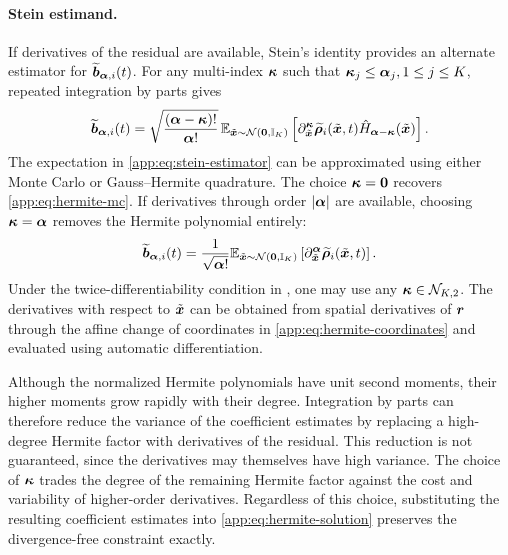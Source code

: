 \paragraph{Stein estimand.}
If derivatives of the residual are available, Stein's identity provides an alternate estimator for $\widetilde{\boldsymbol{b}}_{\boldsymbol{\alpha},i}(t)$.
For any multi-index $\boldsymbol{\kappa}$ such that $\boldsymbol{\kappa}_j \leq \boldsymbol{\alpha}_j, 1 \leq j \leq K$, repeated integration by parts gives
\begin{equation}\label{app:eq:stein-estimator}
\widetilde{\boldsymbol{b}}_{\boldsymbol{\alpha},i}(t)=\sqrt{\frac{(\boldsymbol{\alpha}-\boldsymbol{\kappa})!}{\boldsymbol{\alpha}!}}\,\mathbb{E}_{\tilde{\boldsymbol{x}}\sim\mathcal{N}(\boldsymbol{0},\mathbb{I}_K)}\left[\partial_{\tilde{\boldsymbol{x}}}^{\boldsymbol{\kappa}}\widetilde{\boldsymbol{\rho}}_i(\tilde{\boldsymbol{x}},t)\hat{H}_{\boldsymbol{\alpha}-\boldsymbol{\kappa}}(\tilde{\boldsymbol{x}})\right].
\end{equation}
The expectation in \cref{app:eq:stein-estimator} can be approximated using either Monte Carlo or Gauss--Hermite quadrature.
The choice $\boldsymbol{\kappa}=\boldsymbol{0}$ recovers \cref{app:eq:hermite-mc}.
If derivatives through order $|\boldsymbol{\alpha}|$ are available, choosing $\boldsymbol{\kappa}=\boldsymbol{\alpha}$ removes the Hermite polynomial entirely:
\begin{equation*}
\widetilde{\boldsymbol{b}}_{\boldsymbol{\alpha},i}(t) =\frac{1}{\sqrt{\boldsymbol{\alpha}!}} \mathbb{E}_{\tilde{\boldsymbol{x}}\sim\mathcal{N}(\boldsymbol{0},\mathbb{I}_K)}\left[\partial_{\tilde{\boldsymbol{x}}}^{\boldsymbol{\alpha}} \widetilde{\boldsymbol{\rho}}_i(\tilde{\boldsymbol{x}},t) \right].
\end{equation*}
Under the twice-differentiability condition in , one may use any $\boldsymbol{\kappa} \in \mathcal{N}_{K, 2}$.
The derivatives with respect to $\tilde{\boldsymbol{x}}$ can be obtained from spatial derivatives of $\boldsymbol{r}$ through the affine change of coordinates in \cref{app:eq:hermite-coordinates} and evaluated using automatic differentiation.

Although the normalized Hermite polynomials have unit second moments, their higher moments grow rapidly with their degree.
Integration by parts can therefore reduce the variance of the coefficient estimates by replacing a high-degree Hermite factor with derivatives of the residual.
This reduction is not guaranteed, since the derivatives may themselves have high variance.
The choice of $\boldsymbol{\kappa}$ trades the degree of the remaining Hermite factor against the cost and variability of higher-order derivatives.
Regardless of this choice, substituting the resulting coefficient estimates into \cref{app:eq:hermite-solution} preserves the divergence-free constraint exactly.

